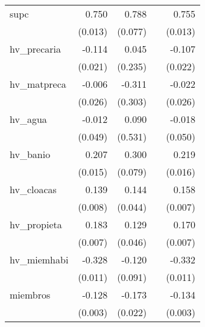 {\begin{longtable}{l*{4}{D{.}{.}{-1}}}
\addlinespace
supc        &       0.750\sym{***}&       0.788\sym{***}&                     &       0.755\sym{***}\\
            &     (0.013)         &     (0.077)         &                     &     (0.013)         \\
\addlinespace
hv\_precaria &      -0.114\sym{***}&       0.045         &                     &      -0.107\sym{***}\\
            &     (0.021)         &     (0.235)         &                     &     (0.022)         \\
\addlinespace
hv\_matpreca &      -0.006         &      -0.311         &                     &      -0.022         \\
            &     (0.026)         &     (0.303)         &                     &     (0.026)         \\
\addlinespace
hv\_agua     &      -0.012         &       0.090         &                     &      -0.018         \\
            &     (0.049)         &     (0.531)         &                     &     (0.050)         \\
\addlinespace
hv\_banio    &       0.207\sym{***}&       0.300\sym{***}&                     &       0.219\sym{***}\\
            &     (0.015)         &     (0.079)         &                     &     (0.016)         \\
\addlinespace
hv\_cloacas  &       0.139\sym{***}&       0.144\sym{**} &                     &       0.158\sym{***}\\
            &     (0.008)         &     (0.044)         &                     &     (0.007)         \\
\addlinespace
hv\_propieta &       0.183\sym{***}&       0.129\sym{**} &                     &       0.170\sym{***}\\
            &     (0.007)         &     (0.046)         &                     &     (0.007)         \\
\addlinespace
hv\_miemhabi &      -0.328\sym{***}&      -0.120         &                     &      -0.332\sym{***}\\
            &     (0.011)         &     (0.091)         &                     &     (0.011)         \\
\addlinespace
miembros    &      -0.128\sym{***}&      -0.173\sym{***}&                     &      -0.134\sym{***}\\
            &     (0.003)         &     (0.022)         &                     &     (0.003)         \\

\end{longtable}}
